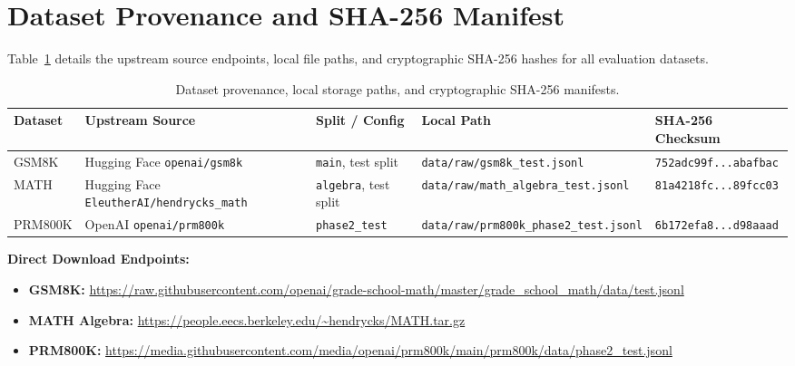 \documentclass[11pt,letterpaper]{article}
\begin{document}
\section{Dataset Provenance and SHA-256 Manifest}\label{sec:dataset-provenance}

Table~\ref{tab:dataset-provenance} details the upstream source endpoints, local file paths, and cryptographic SHA-256 hashes for all evaluation datasets.

\begin{table}[htbp]
\centering
\small
\caption{Dataset provenance, local storage paths, and cryptographic SHA-256 manifests.}
\label{tab:dataset-provenance}
\begin{tabular}{lllll}
\toprule
Dataset & Upstream Source & Split / Config & Local Path & SHA-256 Checksum \\
\midrule
GSM8K & Hugging Face \texttt{openai/gsm8k} & \texttt{main}, test split & \texttt{data/raw/gsm8k\_test.jsonl} & \texttt{752adc99f...abafbac} \\
MATH & Hugging Face \texttt{EleutherAI/hendrycks\_math} & \texttt{algebra}, test split & \texttt{data/raw/math\_algebra\_test.jsonl} & \texttt{81a4218fc...89fcc03} \\
PRM800K & OpenAI \texttt{openai/prm800k} & \texttt{phase2\_test} & \texttt{data/raw/prm800k\_phase2\_test.jsonl} & \texttt{6b172efa8...d98aaad} \\
\bottomrule
\end{tabular}
\end{table}

\textbf{Direct Download Endpoints:}
\begin{itemize}
    \item \textbf{GSM8K:} \url{https://raw.githubusercontent.com/openai/grade-school-math/master/grade_school_math/data/test.jsonl}
    \item \textbf{MATH Algebra:} \url{https://people.eecs.berkeley.edu/~hendrycks/MATH.tar.gz}
    \item \textbf{PRM800K:} \url{https://media.githubusercontent.com/media/openai/prm800k/main/prm800k/data/phase2_test.jsonl}
\end{itemize}

\end{document}
